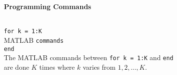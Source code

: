 \documentclass{ximera}
\begin{document}
{\begin{tabbing}
\end{tabbing}
 

\centerline{
{\bf Programming Commands}
} \vspace*{-0.1in}
\begin{tabbing}
 \hspace{1.1in} \= \\

     {\tt for k = 1:K}   \>\\
	\hspace{0.1in} MATLAB {\tt commands} \> \\
     {\tt end} \> \\
\> The MATLAB commands between {\tt for k = 1:K} and {\tt end}\\ \>
are done $K$ times where $k$ varies from $1,2,\ldots,K$.

\end{tabbing}
}
\end{document}
